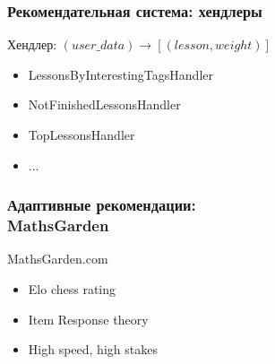 \documentclass{beamer}
\begin{document}
\begin{frame}\frametitle{Рекомендательная система: хендлеры}
\bigskip
Хендлер: $(user\_data) \rightarrow [(lesson, weight)]$

    \begin{itemize}
        \item LessonsByInterestingTagsHandler
        \item NotFinishedLessonsHandler
        \item TopLessonsHandler
        \item ...
    \end{itemize}

\begin{figure}[H]
\end{figure}

\end{frame}

\begin{frame}\frametitle{Адаптивные рекомендации: \\MathsGarden}

    \bigskip
    MathsGarden.com\cite{mathsgarden}
    
    \begin{itemize}
        \item Elo chess rating
        \item Item Response theory
        \item High speed, high stakes
    \end{itemize}
    
    \begin{figure}[t]
      \centering
      \hfill
      
    \end{figure}
    
\end{frame}
\end{document}
